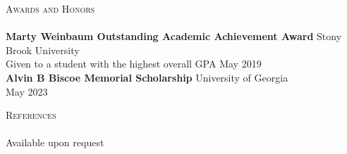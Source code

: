 \documentclass[a4paper]{article}
\newcommand{\lineunder} {
    \vspace*{-8pt} \\
    \hspace*{-18pt} \hrulefill \\
}
\newcommand{\header} [1] {
    {\hspace*{-18pt}\vspace*{6pt} \textsc{#1}}
    \vspace*{-6pt} \lineunder
}
\begin{document}
\header{Awards and Honors}
\textbf{Marty Weinbaum Outstanding Academic Achievement Award} \hfill Stony Brook University\\
Given to a student with the highest overall GPA \hfill May 2019\\
\vspace*{2mm}
\textbf{Alvin B Biscoe Memorial Scholarship} \hfill University of Georgia\\
\hfill May 2023\\
\vspace*{2mm}

\header{References}
Available upon request
\end{document}
